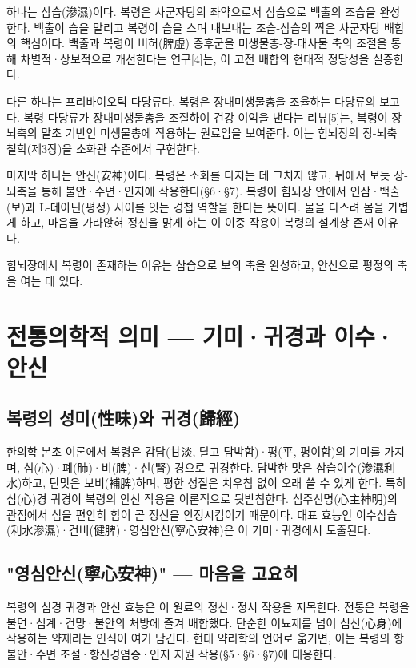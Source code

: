\documentclass[12pt,oneside]{book}
\begin{document}
하나는 삼습(滲濕)이다. 복령은 사군자탕의 좌약으로서 삼습으로 백출의 조습을 완성한다. 백출이 습을 말리고 복령이 습을 스며 내보내는 조습-삼습의 짝은 사군자탕 배합의 핵심이다. 백출과 복령이 비허(脾虛) 증후군을 미생물총-장-대사물 축의 조절을 통해 차별적·상보적으로 개선한다는 연구[4]는, 이 고전 배합의 현대적 정당성을 실증한다.

다른 하나는 프리바이오틱 다당류다. 복령은 장내미생물총을 조율하는 다당류의 보고다. 복령 다당류가 장내미생물총을 조절하여 건강 이익을 낸다는 리뷰[5]는, 복령이 장-뇌축의 말초 기반인 미생물총에 작용하는 원료임을 보여준다. 이는 힘뇌장의 장-뇌축 철학(제3장)을 소화관 수준에서 구현한다.

마지막 하나는 안신(安神)이다. 복령은 소화를 다지는 데 그치지 않고, 뒤에서 보듯 장-뇌축을 통해 불안·수면·인지에 작용한다(§6·§7). 복령이 힘뇌장 안에서 인삼·백출(보)과 L-테아닌(평정) 사이를 잇는 경첩 역할을 한다는 뜻이다. 물을 다스려 몸을 가볍게 하고, 마음을 가라앉혀 정신을 맑게 하는 이 이중 작용이 복령의 설계상 존재 이유다.

힘뇌장에서 복령이 존재하는 이유는 삼습으로 보의 축을 완성하고, 안신으로 평정의 축을 여는 데 있다.

\section{전통의학적 의미 — 기미·귀경과 이수·안신}

\subsection{복령의 성미(性味)와 귀경(歸經)}

한의학 본초 이론에서 복령은 감담(甘淡, 달고 담박함)·평(平, 평이함)의 기미를 가지며, 심(心)·폐(肺)·비(脾)·신(腎) 경으로 귀경한다. 담박한 맛은 삼습이수(滲濕利水)하고, 단맛은 보비(補脾)하며, 평한 성질은 치우침 없이 오래 쓸 수 있게 한다. 특히 심(心)경 귀경이 복령의 안신 작용을 이론적으로 뒷받침한다. 심주신명(心主神明)의 관점에서 심을 편안히 함이 곧 정신을 안정시킴이기 때문이다. 대표 효능인 이수삼습(利水滲濕)·건비(健脾)·영심안신(寧心安神)은 이 기미·귀경에서 도출된다.

\subsection{"영심안신(寧心安神)" — 마음을 고요히}

복령의 심경 귀경과 안신 효능은 이 원료의 정신·정서 작용을 지목한다. 전통은 복령을 불면·심계·건망·불안의 처방에 즐겨 배합했다. 단순한 이뇨제를 넘어 심신(心身)에 작용하는 약재라는 인식이 여기 담긴다. 현대 약리학의 언어로 옮기면, 이는 복령의 항불안·수면 조절·항신경염증·인지 지원 작용(§5·§6·§7)에 대응한다.
\end{document}
